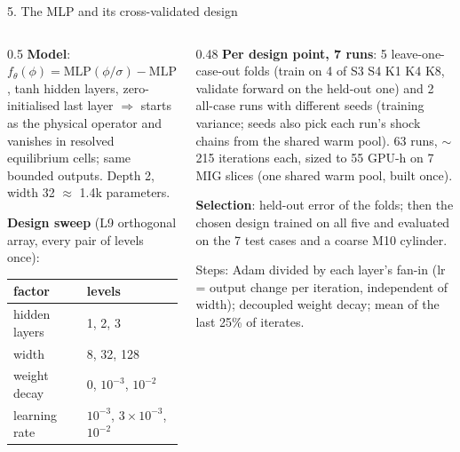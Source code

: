 \documentclass[10pt,aspectratio=169]{beamer}
\begin{document}
\begin{frame}{5. The MLP and its cross-validated design}
\begin{columns}[T]
\begin{column}{0.5\textwidth}
\small
\textbf{Model}: $f_\theta(\phi)=\mathrm{MLP}(\phi/\sigma)-\mathrm{MLP}(0)$, tanh hidden layers,
zero-initialised last layer $\Rightarrow$ starts as the physical operator and vanishes in
resolved equilibrium cells; same bounded outputs. Depth 2, width 32 $\approx$ 1.4k parameters.

\medskip
\textbf{Design sweep} (L9 orthogonal array, every pair of levels once):
\begin{center}
\begin{tabular}{@{}ll@{}}
\toprule
factor & levels \\ \midrule
hidden layers & 1, 2, 3 \\
width & 8, 32, 128 \\
weight decay & 0, $10^{-3}$, $10^{-2}$ \\
learning rate & $10^{-3}$, $3\!\times\!10^{-3}$, $10^{-2}$ \\
\bottomrule
\end{tabular}
\end{center}
\end{column}
\begin{column}{0.48\textwidth}
\small
\textbf{Per design point, 7 runs}: 5 leave-one-case-out folds (train on 4 of S3 S4 K1 K4 K8,
validate forward on the held-out one) and 2 all-case runs with different seeds (training
variance; seeds also pick each run's shock chains from the shared warm pool).
63 runs, $\sim$215 iterations each, sized to 55 GPU-h on 7 MIG slices (one shared warm pool,
built once).

\medskip
\textbf{Selection}: held-out error of the folds; then the chosen design trained on all five
and evaluated on the 7 test cases and a coarse M10 cylinder.

\medskip
\footnotesize
Steps: Adam divided by each layer's fan-in (lr = output change per iteration, independent of
width); decoupled weight decay; mean of the last 25\% of iterates.
\end{column}
\end{columns}
\end{frame}
\end{document}
